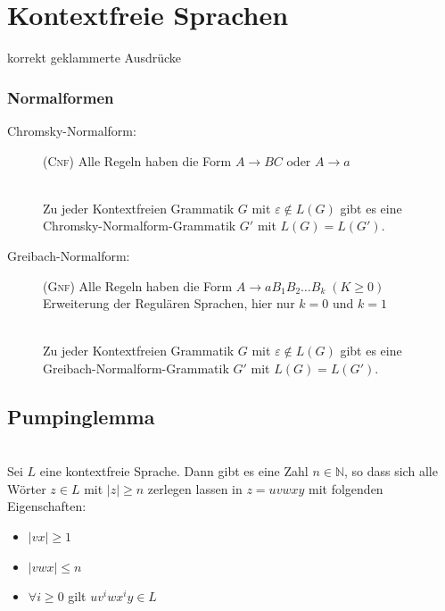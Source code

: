 \documentclass{scrartcl}
\begin{document}
\section*{Kontextfreie Sprachen}
{\tiny korrekt geklammerte Ausdrücke}
\subsubsection*{Normalformen}
\begin{description}
    \item[Chromsky-Normalform:] (\textsc{Cnf}) Alle Regeln haben die Form $A\to BC$ oder $A\to a$
    \begin{shaded}
        \ \\Zu jeder Kontextfreien Grammatik $G$ mit $\varepsilon\not\in L(G)$ gibt es eine Chromsky-Normalform-Grammatik $G'$ mit $L(G) = L(G')$.
    \end{shaded}
    \item[Greibach-Normalform:] (\textsc{Gnf}) Alle Regeln haben die Form $A\to aB_1B_2\dots B_k\; (K\geq0)$ \\ {\tiny Erweiterung der Regulären Sprachen, hier nur $k=0$ und $k=1$}
    \begin{shaded}
        \ \\Zu jeder Kontextfreien Grammatik $G$ mit $\varepsilon\not\in L(G)$ gibt es eine Greibach-Normalform-Grammatik $G'$ mit $L(G) = L(G')$.
    \end{shaded}
\end{description}

\subsection*{Pumpinglemma}
\begin{shaded}
    \ \\Sei $L$ eine kontextfreie Sprache. Dann gibt es eine Zahl $n\in \mathds{N}$, so dass sich alle Wörter $z\in L$ mit $|z|\geq n$ zerlegen lassen in $z=uvwxy$ mit folgenden Eigenschaften:
    \begin{minipage}{0.48\textwidth}
        \begin{itemize}
            \item $|vx|\geq 1$
            \item $|vwx|\leq n$
            \item $\forall i\geq0$ gilt $uv^iwx^iy\in L$
        \end{itemize}
    \end{minipage}
    \hfill \vrule \hfill
    \begin{minipage}{0.48\textwidth}
        \begin{center}
        \ \\[.5cm]
        \scalebox{0.75}{}
        \end{center}
    \end{minipage}
\end{shaded}
\end{document}
